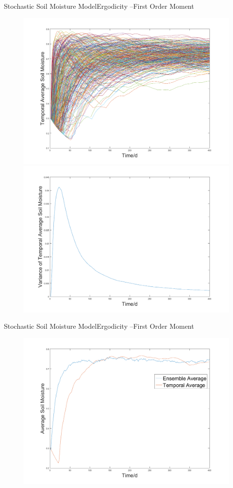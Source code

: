 \documentclass[10pt]{beamer}
\begin{document}
\begin{frame}{Stochastic Soil Moisture Model}{Ergodicity --First Order Moment}
 \begin{figure}
\centering
\includegraphics[width=.5\textwidth]{temporal_average_simulation.png}
\includegraphics[width=.5\textwidth]{temporal_average_variance.png}
\end{figure}
\end{frame}



\begin{frame}{Stochastic Soil Moisture Model}{Ergodicity --First Order Moment}
 \begin{figure}
\centering
\includegraphics[width=.91\textwidth]{ergodicity.png}
 
\end{figure}
\end{frame}
\end{document}
